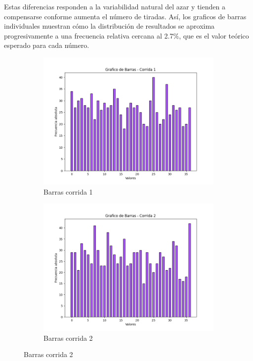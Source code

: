\documentclass{article}
\begin{document}
Estas diferencias responden a la variabilidad natural del azar y tienden a compensarse conforme aumenta el número de tiradas. Así, los graficos de barras individuales muestran cómo la distribución de resultados se aproxima progresivamente a una frecuencia relativa cercana al 2.7\%, que es el valor teórico esperado para cada número. 
\begin{figure}[htbp]
    \centering
    \begin{subfigure}[b]{0.45\textwidth}
        \centering
        \includegraphics[width=\textwidth]{Imagenes/Barras_corrida_1.png}
        
        \caption{Barras corrida 1}
    \end{subfigure}
    \hfill
    \begin{subfigure}[b]{0.45\textwidth}
        \centering
        \includegraphics[width=\textwidth]{Imagenes/Barras_corrida_2.png}
        \caption{Barras corrida 2}
    \end{subfigure}
    

\end{figure}
\end{document}
